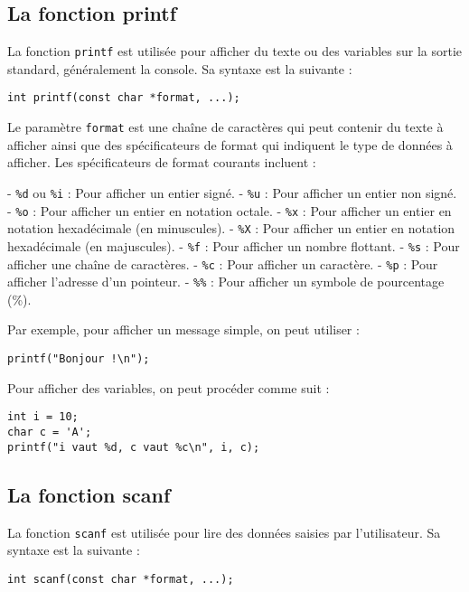 \documentclass[french,11pt]{article}
\begin{document}
\subsection{La fonction printf}
La fonction \texttt{printf} est utilisée pour afficher du texte ou des variables sur la sortie standard, généralement la console. Sa syntaxe est la suivante :

\begin{verbatim}
int printf(const char *format, ...);
\end{verbatim}

Le paramètre \texttt{format} est une chaîne de caractères qui peut contenir du texte à afficher ainsi que des spécificateurs de format qui indiquent le type de données à afficher. Les spécificateurs de format courants incluent :

- \texttt{\%d} ou \texttt{\%i} : Pour afficher un entier signé.
- \texttt{\%u} : Pour afficher un entier non signé.
- \texttt{\%o} : Pour afficher un entier en notation octale.
- \texttt{\%x} : Pour afficher un entier en notation hexadécimale (en minuscules).
- \texttt{\%X} : Pour afficher un entier en notation hexadécimale (en majuscules).
- \texttt{\%f} : Pour afficher un nombre flottant.
- \texttt{\%s} : Pour afficher une chaîne de caractères.
- \texttt{\%c} : Pour afficher un caractère.
- \texttt{\%p} : Pour afficher l'adresse d'un pointeur.
- \texttt{\%\%} : Pour afficher un symbole de pourcentage (\%).

Par exemple, pour afficher un message simple, on peut utiliser :

\begin{verbatim}
printf("Bonjour !\n");
\end{verbatim}

Pour afficher des variables, on peut procéder comme suit :

\begin{verbatim}
int i = 10;
char c = 'A';
printf("i vaut %d, c vaut %c\n", i, c);
\end{verbatim}

\subsection{La fonction scanf}
La fonction \texttt{scanf} est utilisée pour lire des données saisies par l'utilisateur. Sa syntaxe est la suivante :

\begin{verbatim}
int scanf(const char *format, ...);
\end{verbatim}
\end{document}
